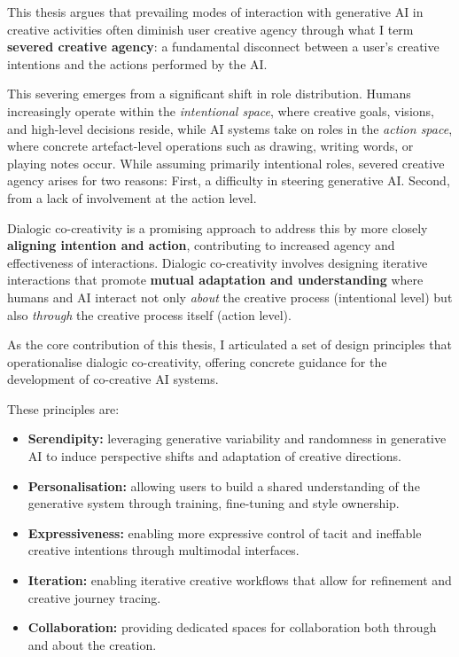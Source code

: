 This thesis argues that prevailing modes of interaction with generative AI in creative activities often diminish user creative agency through what I term \textbf{severed creative agency}: a fundamental disconnect between a user's creative intentions and the actions performed by the AI. 

This severing emerges from a significant shift in role distribution. Humans increasingly operate within the \textit{intentional space}, where creative goals, visions, and high-level decisions reside, while AI systems take on roles in the \textit{action space}, where concrete artefact-level operations such as drawing, writing words, or playing notes occur. While assuming primarily intentional roles, severed creative agency arises for two reasons: First, a difficulty in steering generative AI. Second, from a lack of involvement at the action level.

Dialogic co-creativity is a promising approach to address this by more closely \textbf{aligning intention and action}, contributing to increased agency and effectiveness of interactions. Dialogic co-creativity involves designing iterative interactions that promote \textbf{mutual adaptation and understanding} where humans and AI interact not only \textit{about} the creative process (intentional level) but also \textit{through} the creative process itself (action level). 

As the core contribution of this thesis, I articulated a set of design principles that operationalise dialogic co-creativity, offering concrete guidance for the development of co-creative AI systems. 

These principles are: 

\begin{tcolorbox}[colback=gray!5, colframe=gray!60!black, title=\textbf{Design Principles for Human–AI Co-Creativity}, sharp corners=south, fonttitle=\bfseries]
\begin{itemize}
    \item \textbf{Serendipity:} leveraging generative variability and randomness in generative AI to induce perspective shifts and adaptation of creative directions.
    \item \textbf{Personalisation:} allowing users to build a shared understanding of the generative system through training, fine-tuning and style ownership.
    \item \textbf{Expressiveness:} enabling more expressive control of tacit and ineffable creative intentions through multimodal interfaces.
    \item \textbf{Iteration:} enabling iterative creative workflows that allow for refinement and creative journey tracing.
    \item \textbf{Collaboration:} providing dedicated spaces for collaboration both through and about the creation.
\end{itemize}
\end{tcolorbox}

